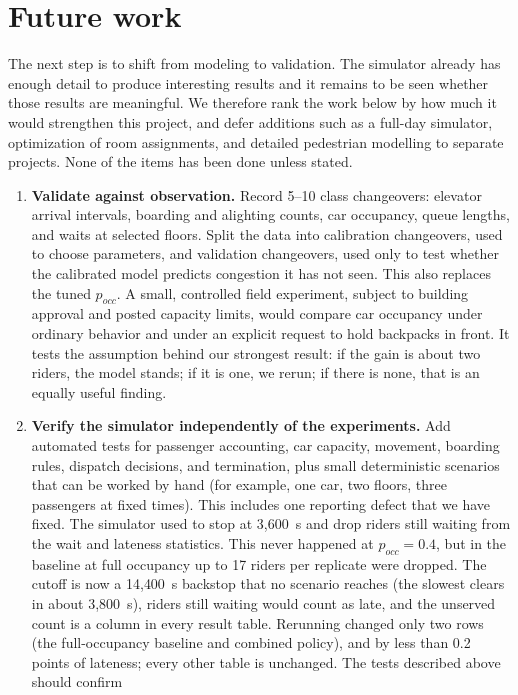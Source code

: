 \section{Future work}
\label{sec:future}

The next step is to shift from modeling to validation. The simulator already has enough detail to produce interesting results and it remains to be seen whether those results are meaningful. We therefore rank the work below by how much it would
strengthen this project, and defer additions such as a full-day simulator, optimization of room assignments, and
detailed pedestrian modelling to separate projects. None of the items has been done unless stated.

\begin{enumerate}
\item \textbf{Validate against observation.} Record 5--10 class changeovers: elevator arrival intervals, boarding
and alighting counts, car occupancy, queue lengths, and waits at selected floors. Split the data into calibration
changeovers, used to choose parameters, and validation changeovers, used only to test whether the calibrated model
predicts congestion it has not seen. This also replaces the tuned $p_{occ}$. A small, controlled field experiment,
subject to building approval and posted capacity limits, would compare car occupancy under ordinary behavior and
under an explicit request to hold backpacks in front. It tests the assumption behind our strongest result: if the
gain is about two riders, the model stands; if it is one, we rerun; if there is none, that is an equally useful
finding.
\item \textbf{Verify the simulator independently of the experiments.} Add automated tests for passenger
accounting, car capacity, movement, boarding rules, dispatch decisions, and termination, plus small deterministic
scenarios that can be worked by hand (for example, one car, two floors, three passengers at fixed times). This
includes one reporting defect that we have fixed. The simulator used to stop at 3{,}600~s and drop riders still
waiting from the wait and lateness statistics. This never happened at $p_{occ}=0.4$, but in the baseline at full
occupancy up to 17 riders per replicate were dropped. The cutoff is now a 14{,}400~s backstop that no scenario
reaches (the slowest clears in about 3{,}800~s), riders still waiting would count as late, and the unserved count is
a column in every result table. Rerunning changed only two rows (the full-occupancy baseline and combined policy),
and by less than 0.2 points of lateness; every other table is unchanged. The tests described above should confirm

\end{enumerate}
